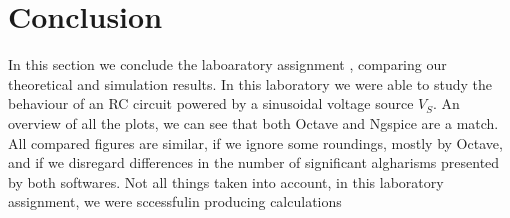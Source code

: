 \section{Conclusion}
\label{sec:conclusion}


In this section we conclude the laboaratory assignment , comparing our theoretical and simulation results. 
In this laboratory we were able to study the behaviour of an RC circuit powered by a sinusoidal voltage source $V_S$.
An overview of all the plots, we can see that both Octave and Ngspice are a match.
All compared figures are similar, if we ignore some roundings, mostly by Octave, and if we disregard differences in the number of significant algharisms presented by both softwares. 
Not all things taken into account, in this laboratory assignment, we were sccessfulin producing calculations
